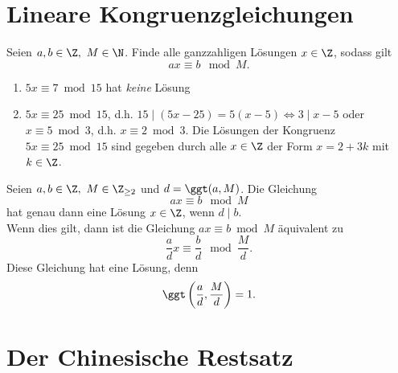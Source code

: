 \section{Lineare Kongruenzgleichungen}

\begin{frage*}
	Seien $a,b \in \Z,\ M \in \N$. Finde alle ganzzahligen Lösungen $x \in \Z$, sodass gilt
	\[ ax \equiv b \mod M. \]
\end{frage*}

\begin{exmp*}
	\begin{enumerate}[label={\roman*})]
		\item \( 5x \equiv 7 \bmod 15 \) hat \textit{keine} Lösung
		\item \( 5x \equiv 25 \bmod 15 \), d.h. \( 15 \mid (5x - 25) = 5(x-5) \iff 3 \mid x-5 \) oder \( x \equiv 5 \bmod 3 \), d.h. \( x \equiv 2 \bmod 3 \). Die Lösungen der Kongruenz \( 5x \equiv 25 \bmod 15 \) sind gegeben durch alle $x \in \Z$ der Form $x = 2+3k$ mit $k \in \Z$.
	\end{enumerate}
\end{exmp*}

\begin{thm}\autolabel
	Seien $a,b \in \Z,\ M \in \Z_{\geq 2}$ und $d = \ggt(a,M)$. Die Gleichung
	\[ ax \equiv b \mod M \]
	hat genau dann eine Lösung $x \in \Z$, wenn $d \mid b$.\\
	Wenn dies gilt, dann ist die Gleichung $ax \equiv b \bmod M$ äquivalent zu 
	\[ \frac{a}{d} x \equiv \frac{b}{d} \mod \frac{M}{d}. \]
	Diese Gleichung hat eine Lösung, denn
	\[ \ggt \left( \frac{a}{d}, \frac{M}{d} \right) = 1. \]
\end{thm}

\section{Der Chinesische Restsatz}

